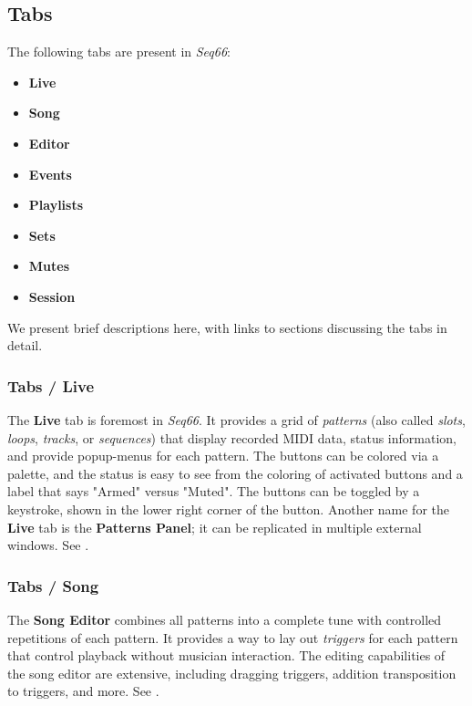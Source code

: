 \subsection{Tabs}
\label{subsec:introduction_main_tabs}

   The following tabs are present in \textsl{Seq66}:

   \begin{itemize}
      \item \textbf{Live}
      \item \textbf{Song}
      \item \textbf{Editor}
      \item \textbf{Events}
      \item \textbf{Playlists}
      \item \textbf{Sets}
      \item \textbf{Mutes}
      \item \textbf{Session}
   \end{itemize}

   We present brief descriptions here, with links to sections
   discussing the tabs in detail.

\subsubsection{Tabs / Live}
\label{subsubsec:introduction_main_tabs_live}

   The \textbf{Live} tab is foremost in \textsl{Seq66}.
   It provides a grid of \textsl{patterns}
   (also called \textsl{slots}, \textsl{loops}, \textsl{tracks}, or
   \textsl{sequences}) that display recorded MIDI data, status information, and
   provide popup-menus for each pattern.
   The buttons can
   be colored via a palette, and the status is easy to see
   from the coloring of activated buttons and a label that says "Armed"
   versus "Muted".
   The buttons can be toggled by a keystroke, shown in the lower
   right corner of the button.
   Another name for the \textbf{Live} tab is the \textbf{Patterns Panel};
   it can be replicated in multiple external windows.
   See .

\subsubsection{Tabs / Song}
\label{subsubsec:introduction_main_tabs_song}

   The \textbf{Song Editor} combines all patterns
   into a complete tune with controlled repetitions of each pattern.
   It provides a way to lay out \textsl{triggers} for each pattern
   that control playback without musician interaction.
   The editing capabilities of the song editor are extensive, including
   dragging triggers, addition transposition to triggers, and more.
   See .

